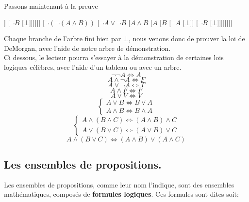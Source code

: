 \documentclass[a4paper, 12pt]{article}
\newcommand{\ffi}{\Leftrightarrow}
\numberwithin{equation}{subsection}
\begin{document}
  Passons maintenant à la preuve
  \begin{center}
  \begin{forest}
  [$\neg (\neg (A \land B) \ffi \neg A \lor \neg B)$
    [$\neg(A \land B)$
    [$\neg (\neg A \lor \neg B)$
    [$A$
    [$B$
    [$\neg A$
    [$\bot$]]
    [$\neg B$
    [$\bot$]]]]]]
    [$\neg (\neg (A \land B))$
    [$ \neg A \lor \neg B$
    [$A \land B$
    [$A$
    [$B$
    [$\neg A$
    [$\bot$]]
    [$\neg B$
    [$\bot$]]]]]]]]
  \end{forest}
\end{center}
Chaque branche de l'arbre fini bien par $\bot$, nous venons donc de prouver la loi de DeMorgan, avec l'aide de notre arbre de démonstration. \\

    Ci dessous, le lecteur pourra s'essayer à la démonstration de certaines lois logiques célèbres, avec l'aide d'un tableau ou avec un arbre. \\[1.0cm]
  \begin{equation}\neg \neg A \ffi A \end{equation}
  \begin{equation} A \land \neg A \ffi F \end{equation}
  \begin{equation} A \lor \neg A \ffi T \end{equation}
  \begin{equation} A \land F \ffi F \end{equation}
  \begin{equation} A \lor V \ffi V \end{equation}
  \begin{equation}
    \begin{cases}
      A \lor B \ffi B \lor A \\
      A \land B \ffi B \land A
    \end{cases}
  \end{equation}
  \begin{equation}
    \begin{cases}
      A \land (B \land C) \ffi (A \land B) \land C \\
      A \lor (B \lor C) \ffi (A \lor B) \lor C
    \end{cases}
  \end{equation}
  \begin{equation}A \land (B \lor C) \ffi (A \land B) \lor (A \land C) \end{equation}
  \subsection{Les ensembles de propositions.}
  Les ensembles de propositions, comme leur nom l'indique, sont des ensembles mathématiques, composés de {\bf formules logiques}.
  Ces formules sont dites soit: \\
\end{document}

